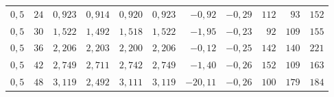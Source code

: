 \documentclass[11pt,a4paper]{article}
\numberwithin{equation}{section}
\begin{document}
\begin{table}[htbp]
\begin{tabular}{rrrrrrrrrrr}
$0{,}5$ & $24$ & $0{,}923$ & $0{,}914$ & $0{,}920$ & $0{,}923$ & $-0{,}92$ & $-0{,}29$ & $112$ & $93$ & $152$ \\
$0{,}5$ & $30$ & $1{,}522$ & $1{,}492$ & $1{,}518$ & $1{,}522$ & $-1{,}95$ & $-0{,}23$ & $92$ & $109$ & $155$ \\
$0{,}5$ & $36$ & $2{,}206$ & $2{,}203$ & $2{,}200$ & $2{,}206$ & $-0{,}12$ & $-0{,}25$ & $142$ & $140$ & $221$ \\
$0{,}5$ & $42$ & $2{,}749$ & $2{,}711$ & $2{,}742$ & $2{,}749$ & $-1{,}40$ & $-0{,}26$ & $152$ & $109$ & $163$ \\
$0{,}5$ & $48$ & $3{,}119$ & $2{,}492$ & $3{,}111$ & $3{,}119$ & $-20{,}11$ & $-0{,}26$ & $100$ & $179$ & $184$ \\
\bottomrule
\end{tabular}
\end{table}
\end{document}
